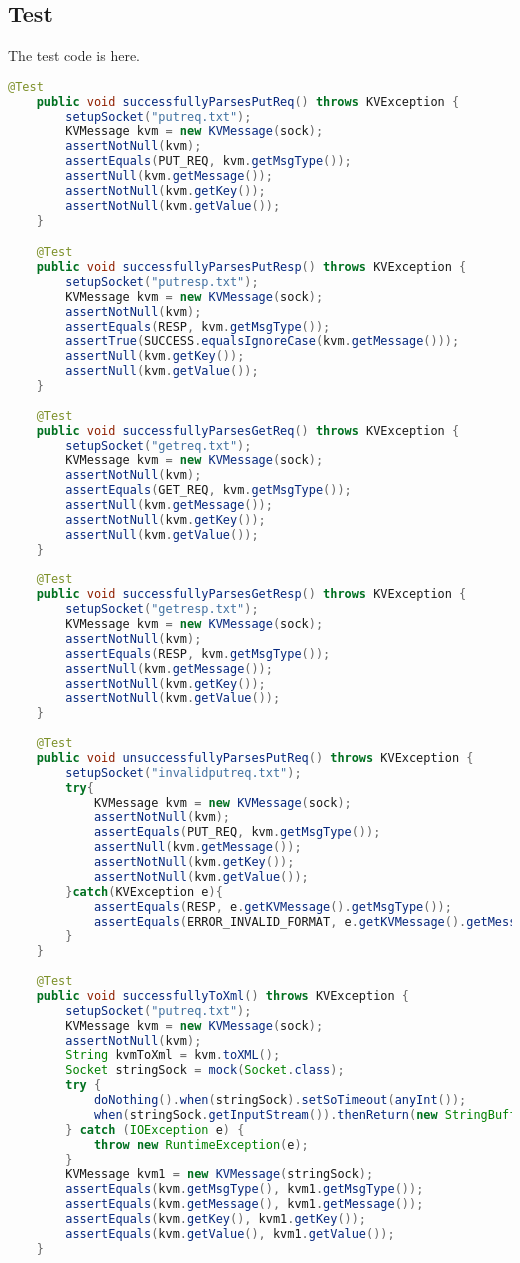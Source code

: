 \documentclass{article}
\begin{document}
\subsection{Test}
The test code is here.
\begin{lstlisting}[language=java]
	@Test
    public void successfullyParsesPutReq() throws KVException {
        setupSocket("putreq.txt");
        KVMessage kvm = new KVMessage(sock);
        assertNotNull(kvm);
        assertEquals(PUT_REQ, kvm.getMsgType());
        assertNull(kvm.getMessage());
        assertNotNull(kvm.getKey());
        assertNotNull(kvm.getValue());
    }

    @Test
    public void successfullyParsesPutResp() throws KVException {
        setupSocket("putresp.txt");
        KVMessage kvm = new KVMessage(sock);
        assertNotNull(kvm);
        assertEquals(RESP, kvm.getMsgType());
        assertTrue(SUCCESS.equalsIgnoreCase(kvm.getMessage()));
        assertNull(kvm.getKey());
        assertNull(kvm.getValue());
    }
    
    @Test
    public void successfullyParsesGetReq() throws KVException {
    	setupSocket("getreq.txt");
        KVMessage kvm = new KVMessage(sock);
        assertNotNull(kvm);
        assertEquals(GET_REQ, kvm.getMsgType());
        assertNull(kvm.getMessage());
        assertNotNull(kvm.getKey());
        assertNull(kvm.getValue());
    }
    
    @Test
    public void successfullyParsesGetResp() throws KVException {
        setupSocket("getresp.txt");
        KVMessage kvm = new KVMessage(sock);
        assertNotNull(kvm);
        assertEquals(RESP, kvm.getMsgType());
        assertNull(kvm.getMessage());
        assertNotNull(kvm.getKey());
        assertNotNull(kvm.getValue());
    }
    
    @Test
    public void unsuccessfullyParsesPutReq() throws KVException {
        setupSocket("invalidputreq.txt");
        try{
        	KVMessage kvm = new KVMessage(sock);
        	assertNotNull(kvm);
            assertEquals(PUT_REQ, kvm.getMsgType());
            assertNull(kvm.getMessage());
            assertNotNull(kvm.getKey());
            assertNotNull(kvm.getValue());
        }catch(KVException e){
        	assertEquals(RESP, e.getKVMessage().getMsgType());
        	assertEquals(ERROR_INVALID_FORMAT, e.getKVMessage().getMessage());
        }
    }
    
    @Test
    public void successfullyToXml() throws KVException {
    	setupSocket("putreq.txt");
    	KVMessage kvm = new KVMessage(sock);
    	assertNotNull(kvm);
    	String kvmToXml = kvm.toXML();
    	Socket stringSock = mock(Socket.class);
    	try {
            doNothing().when(stringSock).setSoTimeout(anyInt());
            when(stringSock.getInputStream()).thenReturn(new StringBufferInputStream(kvmToXml));
        } catch (IOException e) {
            throw new RuntimeException(e);
        }
    	KVMessage kvm1 = new KVMessage(stringSock);
    	assertEquals(kvm.getMsgType(), kvm1.getMsgType());
    	assertEquals(kvm.getMessage(), kvm1.getMessage());
    	assertEquals(kvm.getKey(), kvm1.getKey());
    	assertEquals(kvm.getValue(), kvm1.getValue());
    }
\end{lstlisting}
\end{document}
